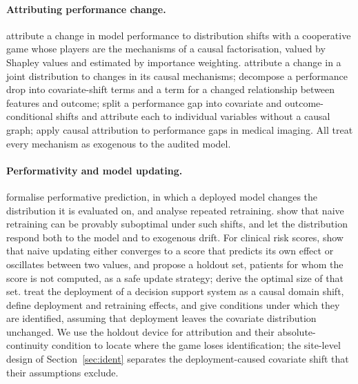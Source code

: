 \documentclass[letterpaper]{article} %
\begin{document}
\paragraph{Attributing performance change.} \citet{zhang2023attributing}
attribute a change in model performance to distribution shifts with a
cooperative game whose players are the mechanisms of a causal factorisation,
valued by Shapley values and estimated by importance weighting.
\citet{budhathoki2021rootcauses} attribute a change in a joint distribution to
changes in its causal mechanisms; \citet{cai2023disde} decompose a performance
drop into covariate-shift terms and a term for a changed relationship between
features and outcome; \citet{singh2024hierarchical} split a performance gap
into covariate and outcome-conditional shifts and attribute each to individual
variables without a causal graph; \citet{gordaliza2025causal} apply causal
attribution to performance gaps in medical imaging. All treat every mechanism
as exogenous to the audited model.

\paragraph{Performativity and model updating.} \citet{perdomo2020performative}
formalise performative prediction, in which a deployed model changes the
distribution it is evaluated on, and analyse repeated retraining.
\citet{kabra2024limitations} show that naive retraining can be provably
suboptimal under such shifts, and \citet{lee2026partially} let the distribution
respond both to the model and to exogenous drift. For clinical risk scores,
\citet{liley2021model} show that naive updating either converges to a score
that predicts its own effect or oscillates between two values, and propose a
holdout set, patients for whom the score is not computed, as a safe update
strategy; \citet{haidarwehbe2025holdout} derive the optimal size of that set.
\citet{boeken2024evaluating} treat the deployment of a decision support system
as a causal domain shift, define deployment and retraining effects, and give
conditions under which they are identified, assuming that deployment leaves the
covariate distribution unchanged. We use the holdout device for attribution and
their absolute-continuity condition to locate where the game loses
identification; the site-level design of Section~\ref{sec:ident} separates the
deployment-caused covariate shift that their assumptions exclude.
\end{document}
